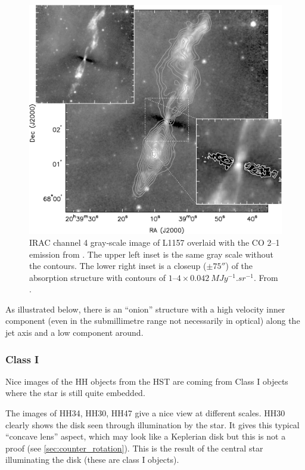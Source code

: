 \documentclass[10pt,a4paper,english]{article}
\begin{document}
\begin{figure}[!ht]
  \begin{center}
    \includegraphics[]{figures/looney2007.jpg}
    \caption{IRAC channel 4 gray‐scale image of L1157 overlaid with the CO 2–1 emission from \cite{Bachiller2001}. The upper left inset is the same gray scale without the contours. The lower right inset is a closeup ($\pm\ang{;;75}$) of the absorption structure with contours of $\numrange{1}{4} \times \SI{0.042}{MJy^{-1}.sr^{-1}}$. From \cite{Looney2007}.}
  \end{center}
\end{figure}

As illustrated below, there is an ``onion'' structure with a high velocity
inner component (even in the submillimetre range not necessarily in optical)
along the jet axis and a low component around.


\subsubsection{Class I}

Nice images of the HH objects from the HST are coming from Class I objects
where the star is still quite embedded.


The images of HH34, HH30, HH47 give a nice view at different scales. HH30
clearly shows the disk seen through illumination by the star. It gives this
typical ``concave lens'' aspect, which may look like a Keplerian disk but this
is not a proof (see \autoref{sec:counter_rotation}). This is the result of the
central star illuminating the disk (these are class I objects).
\end{document}
